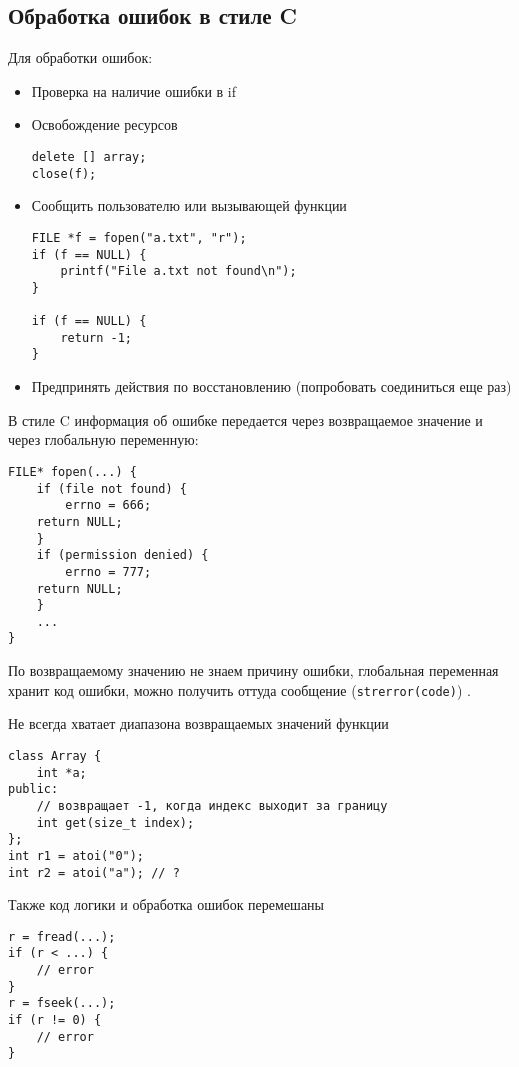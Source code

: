 \subsection{Обработка ошибок в стиле C}
Для обработки ошибок:
\begin{itemize}[noitemsep]
    \item Проверка на наличие ошибки в if
    \item Освобождение ресурсов
	\begin{verbatim}
delete [] array;
close(f);
	\end{verbatim}
    \item Сообщить пользователю или вызывающей функции
	\begin{verbatim}
FILE *f = fopen("a.txt", "r");
if (f == NULL) {
    printf("File a.txt not found\n");
}

if (f == NULL) {
    return -1;
}
	\end{verbatim}

    \item Предпринять действия по восстановлению (попробовать соединиться еще раз)
\end{itemize}
В стиле C  информация об ошибке передается через возвращаемое значение и через глобальную переменную:
\begin{verbatim}
FILE* fopen(...) {
    if (file not found) {
        errno = 666;
	return NULL;
    }
    if (permission denied) {
        errno = 777;
	return NULL;
    }
    ...
}
\end{verbatim}
По возвращаемому значению не знаем причину ошибки, глобальная переменная хранит код ошибки, можно получить оттуда сообщение (\texttt{strerror(code)})
.

Не всегда хватает диапазона возвращаемых значений функции
\begin{verbatim}
class Array {
    int *a;
public:
    // возвращает -1, когда индекс выходит за границу
    int get(size_t index);
};
int r1 = atoi("0");
int r2 = atoi("a"); // ?
\end{verbatim}
Также код логики и обработка ошибок перемешаны
\begin{verbatim}
r = fread(...);
if (r < ...) {
    // error
}
r = fseek(...);
if (r != 0) {
    // error
}
\end{verbatim}
